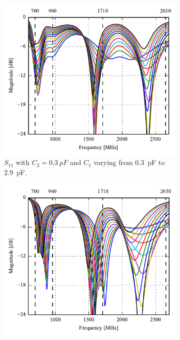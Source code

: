 \begin{figure}[htbp]
    \begin{subfigure}{0.49\linewidth}
        \centering
        \includegraphics{img/tech_sol/trianglefeed/Csh1s11.pdf}
        \caption{$S_{11}$ with $C_2=\SI{0.3}{pF}$ and $C_1$ varying from \SI{0.3}{pF} to \SI{2.9}{pF}.}
    \end{subfigure}
    \hfill
    \begin{subfigure}{0.49\linewidth}
        \centering
        \includegraphics{img/tech_sol/trianglefeed/Csh2s22.pdf}

\end{subfigure}
\end{figure}
